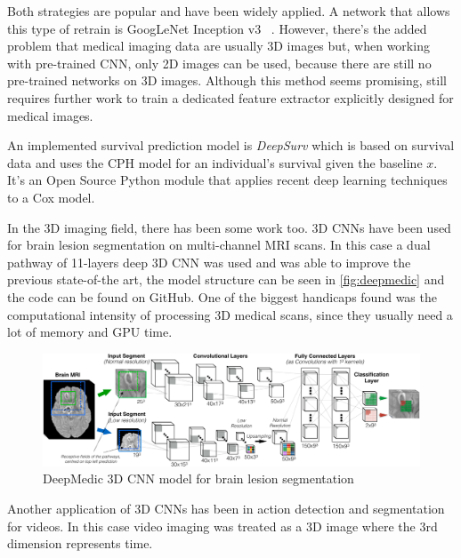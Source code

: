 Both strategies are popular and have been widely applied. A network that allows this type
of retrain is GoogLeNet Inception v3
~\cites{neural:goog-le-net}{neural:retrain}{neural:inception-retrain}.
However, there's the added problem that medical imaging data are usually 3D images but, 
when working with pre-trained \gls{CNN}, only 2D images can be used, because there are still no 
pre-trained networks on 3D images. Although this method seems promising, still requires 
further work to train a dedicated feature extractor explicitly designed for medical images.
~\cite{medical:deep-learning-radiomics-gbm}

An implemented survival prediction model is \emph{DeepSurv} which is based on survival data
and uses the \gls{CPH} model for an individual's survival given the \gls{baseline}
\( x \). It's an Open Source Python module that applies recent deep learning techniques 
to a Cox model.
~\cites{medical:deep-surv}{medical:cox}

In the 3D imaging field, there has been some work too. 3D \glspl{CNN} have
been used for brain lesion segmentation on multi-channel \gls{MRI} scans. In this case a 
dual pathway of 11-layers deep 3D \gls{CNN} was used and was able to improve the previous
state-of-the art, the model structure can be seen in \autoref{fig:deepmedic} and the code 
can be found on GitHub. 
One of the biggest handicaps found was the computational intensity of
processing 3D medical scans, since they usually need a lot of memory and GPU time.
~\cites{neural:deepmedic}{neural:3d-cnn-crf}

\begin{figure}
  \centering
  \includegraphics[width=\textwidth]{images/deepmedic}

  \caption[DeepMedic 3D CNN model]{
    DeepMedic 3D \acrshort{CNN} model for brain lesion segmentation \cite{neural:3d-cnn-crf}
    \label{fig:deepmedic}
  }
\end{figure}

Another application of 3D \glspl{CNN} has been in action detection and segmentation for videos.
In this case video imaging was treated as a 3D image where the 3rd dimension represents
time.
~\cite{neural:3d-cnn-action-detection}


